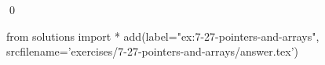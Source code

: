 
\begin{ex}
  \label{ex:7-27-pointers-and-arrays}
  
  \qed
\end{ex}
\begin{python0}
from solutions import *
add(label="ex:7-27-pointers-and-arrays",
    srcfilename='exercises/7-27-pointers-and-arrays/answer.tex')
\end{python0}
